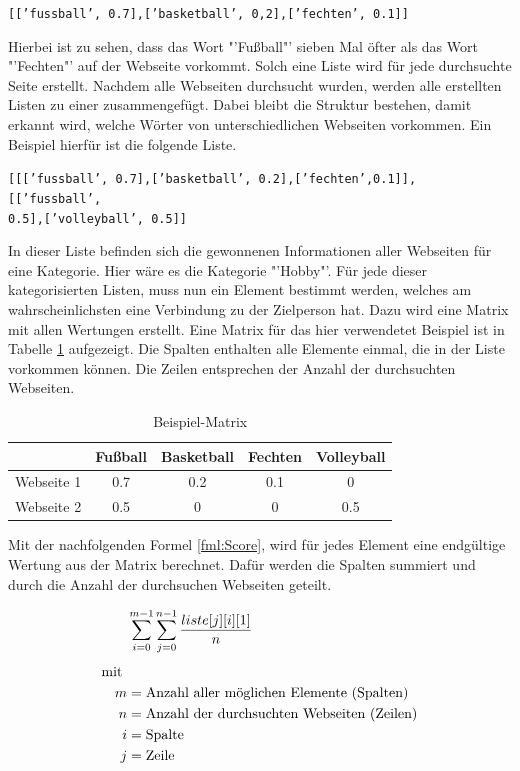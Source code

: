 		\texttt{[['fussball', 0.7],['basketball', 0,2],['fechten', 0.1]]}
		
		Hierbei ist zu sehen, dass das Wort "'Fußball"' sieben Mal öfter als das Wort "'Fechten"' auf der Webseite vorkommt. Solch eine Liste wird für jede durchsuchte Seite erstellt. Nachdem alle Webseiten durchsucht wurden, werden alle erstellten Listen zu einer zusammengefügt. Dabei bleibt die Struktur bestehen, damit erkannt wird, welche Wörter von unterschiedlichen Webseiten vorkommen. Ein Beispiel hierfür ist die folgende Liste.
		
		\texttt{[[['fussball', 0.7],['basketball', 0.2],['fechten',0.1]],
			[['fussball',\\ 0.5],['volleyball', 0.5]]}
		
		In dieser Liste befinden sich die gewonnenen Informationen aller Webseiten für eine Kategorie. Hier wäre es die Kategorie "'Hobby"'. Für jede dieser kategorisierten Listen, muss nun ein Element bestimmt werden, welches am wahrscheinlichsten eine Verbindung zu der Zielperson hat. Dazu wird eine Matrix mit allen Wertungen erstellt. Eine Matrix für das hier verwendetet Beispiel ist in Tabelle \ref{img:beispielMatrix} aufgezeigt. Die Spalten enthalten alle Elemente einmal, die in der Liste vorkommen können. Die Zeilen entsprechen der Anzahl der durchsuchten Webseiten. 
		
		\begin{table}[h!]
			\centering
			\begin{tabular}{ | c | c | c |c |c|}
				\hline
				& Fußball & Basketball & Fechten& Volleyball\\ \hline
				Webseite 1& 0.7 & 0.2 & 0.1 & 0\\ \hline
				Webseite 2& 0.5 & 0 & 0 & 0.5\\ \hline
			\end{tabular}
		\label{img:beispielMatrix}
		\caption{Beispiel-Matrix}
		\end{table}
		
		Mit der nachfolgenden Formel \ref{fml:Score}, wird für jedes Element eine endgültige Wertung aus der Matrix berechnet. Dafür werden die Spalten summiert und durch die Anzahl der durchsuchen Webseiten geteilt.
		
		\begin{align}%
		\label{fml:Score}
		\begin{split}%
		&\sum\limits_{i=0}^{m-1}\sum\limits_{j=0}^{n-1} \frac{liste[j][i][1]}{n}\\[0.25\baselineskip]%
		\text{mit } \\
		m &= \text{Anzahl aller möglichen Elemente (Spalten)}\\
		n &= \text{Anzahl der durchsuchten Webseiten (Zeilen)}\\
		i &= \text{Spalte}\\             %
		j &= \text{Zeile}
		\end{split}
		\end{align}
		

